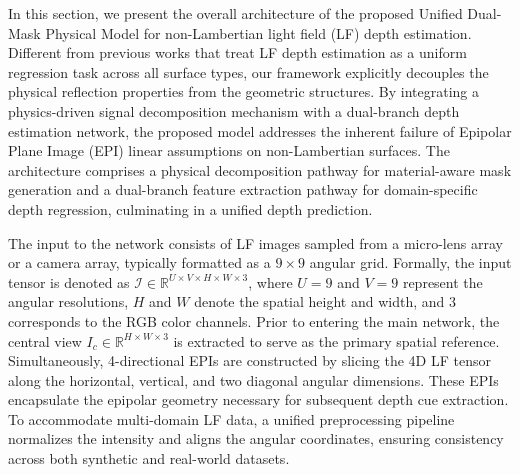 \documentclass[lettersize,journal]{IEEEtran}
\begin{document}
In this section, we present the overall architecture of the proposed Unified Dual-Mask Physical Model for non-Lambertian light field (LF) depth estimation. Different from previous works that treat LF depth estimation as a uniform regression task across all surface types, our framework explicitly decouples the physical reflection properties from the geometric structures. By integrating a physics-driven signal decomposition mechanism with a dual-branch depth estimation network, the proposed model addresses the inherent failure of Epipolar Plane Image (EPI) linear assumptions on non-Lambertian surfaces. The architecture comprises a physical decomposition pathway for material-aware mask generation and a dual-branch feature extraction pathway for domain-specific depth regression, culminating in a unified depth prediction.

The input to the network consists of LF images sampled from a micro-lens array or a camera array, typically formatted as a $9 \times 9$ angular grid. Formally, the input tensor is denoted as $\mathcal{I} \in \mathbb{R}^{U \times V \times H \times W \times 3}$, where $U=9$ and $V=9$ represent the angular resolutions, $H$ and $W$ denote the spatial height and width, and $3$ corresponds to the RGB color channels. Prior to entering the main network, the central view $I_c \in \mathbb{R}^{H \times W \times 3}$ is extracted to serve as the primary spatial reference. Simultaneously, 4-directional EPIs are constructed by slicing the 4D LF tensor along the horizontal, vertical, and two diagonal angular dimensions. These EPIs encapsulate the epipolar geometry necessary for subsequent depth cue extraction. To accommodate multi-domain LF data, a unified preprocessing pipeline normalizes the intensity and aligns the angular coordinates, ensuring consistency across both synthetic and real-world datasets.
\end{document}

